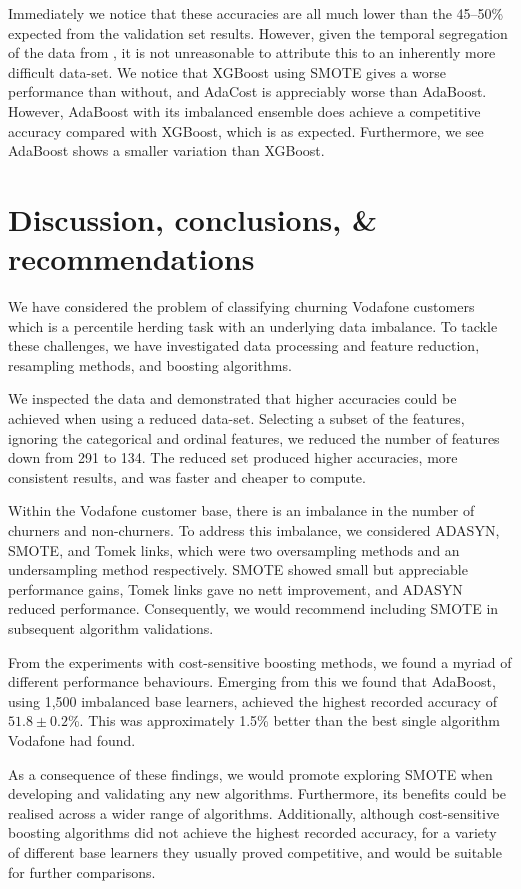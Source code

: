 \documentclass[english,a4paper,twoside,9pt]{extarticle}
\begin{document}
Immediately we notice that these accuracies are all much lower than the 45--50\% expected from the validation set results.  However, given the temporal segregation of the data from , it is not unreasonable to attribute this to an inherently more difficult data-set. We notice that XGBoost using SMOTE gives a worse performance than without, and AdaCost is appreciably worse than AdaBoost. However, AdaBoost with its imbalanced ensemble does achieve a competitive accuracy compared with XGBoost, which is as expected. Furthermore, we see AdaBoost shows a smaller variation than XGBoost.

\section{Discussion, conclusions, \& recommendations}

We have considered the problem of classifying churning Vodafone customers which is a percentile herding task with an underlying data imbalance. To tackle these challenges, we have investigated data processing and feature reduction, resampling methods, and boosting algorithms. 

We inspected the data and demonstrated that higher accuracies could be achieved when using a reduced data-set. Selecting a subset of the features, ignoring the categorical and ordinal features, we reduced the number of features down from 291 to 134. The reduced set produced higher accuracies, more consistent results, and was faster and cheaper to compute. 

Within the Vodafone customer base, there is an imbalance in the number of churners and non-churners. To address this imbalance, we considered ADASYN, SMOTE, and Tomek links, which were two oversampling methods and an undersampling method respectively. SMOTE showed small but appreciable performance gains, Tomek links gave no nett improvement, and ADASYN reduced performance. Consequently, we would recommend including SMOTE in subsequent algorithm validations. 

From the experiments with cost-sensitive boosting methods, we found a myriad of different performance behaviours. Emerging from this we found that AdaBoost, using 1,500 imbalanced base learners, achieved the highest recorded accuracy of $ 51.8\pm 0.2 $\%. This was approximately 1.5\% better than the best single algorithm Vodafone had found.

As a consequence of these findings, we would promote exploring SMOTE when developing and validating any new algorithms. Furthermore, its benefits could be realised across a wider range of algorithms. Additionally, although cost-sensitive boosting algorithms did not achieve the highest recorded accuracy, for a variety of different base learners they usually proved competitive, and would be suitable for further comparisons.
\end{document}
